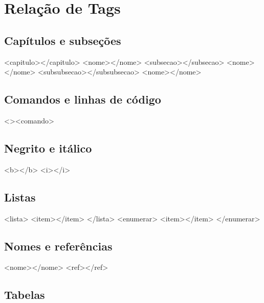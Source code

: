 \newpage \chapter{Relação de Tags}\setcounter{SteP}{1}

\section{Capítulos e subseções}\setcounter{SteP}{1}

\begin{BoxVerbatim}
<capitulo></capitulo>
<nome></nome>
    <subsecao></subsecao>
    <nome></nome>
        <subsubsecao></subsubsecao>
        <nome></nome>
\end{BoxVerbatim}

\section{Comandos e linhas de código}\setcounter{SteP}{1}

\begin{BoxVerbatim}
<\comando><\/comando>
\end{BoxVerbatim}

\section{Negrito e itálico}\setcounter{SteP}{1}

\begin{BoxVerbatim}
<b></b>
<i></i>
\end{BoxVerbatim}

\section{Listas}\setcounter{SteP}{1}

\begin{BoxVerbatim}
<lista>
    <item></item>
</lista>
<enumerar>
    <item></item>
</enumerar>
\end{BoxVerbatim}

\section{Nomes e referências}\setcounter{SteP}{1}

\begin{BoxVerbatim}
<nome></nome>
<ref></ref>
\end{BoxVerbatim}

\section{Tabelas}\setcounter{SteP}{1}

